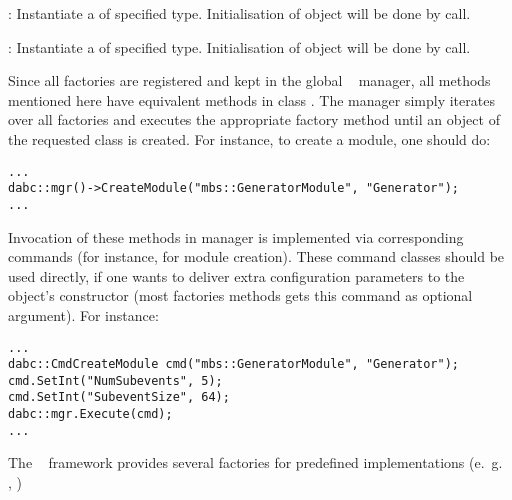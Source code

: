 \item [\func{CreateDataInput()}] : 
   Instantiate a  of specified type.
   Initialisation of object will be done by  call.

\item [\func{CreateDataOutput()}] : 
   Instantiate a  of specified type.
   Initialisation of object will be done by  call.
	
\edes      

Since all factories are registered and kept in the global \dabc~ manager, 
all methods mentioned here  have equivalent methods in class .
The manager simply iterates over all factories and executes the appropriate factory method
until an object of the requested class is created. For instance, to create a module, one should do:

\begin{small}
\begin{verbatim}
...
dabc::mgr()->CreateModule("mbs::GeneratorModule", "Generator");
...
\end{verbatim}     
\end{small}

Invocation of these methods in manager is implemented via corresponding commands
(for instance,  for module creation). 
These command classes should be used directly, if one wants to deliver extra 
configuration parameters to the object's constructor (most factories methods gets
this command as optional argument). For instance:

\begin{small}
\begin{verbatim}
...
dabc::CmdCreateModule cmd("mbs::GeneratorModule", "Generator");
cmd.SetInt("NumSubevents", 5);
cmd.SetInt("SubeventSize", 64);
dabc::mgr.Execute(cmd);
...
\end{verbatim}     
\end{small}

The \dabc~ framework provides several factories for predefined 
implementations (e.~g.~ , )






